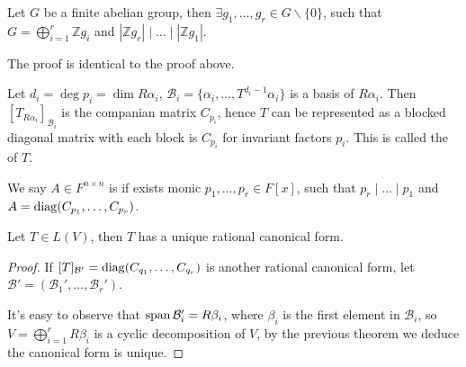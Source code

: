 \begin{theorem}
    Let $G$ be a finite abelian group, then $\exists g_1,\dots,g_r\in G\backslash\{0\}$,
	such that $G = \bigoplus_{i=1}^r \mathbb{Z}g_i$ and
	$|\mathbb{Z}g_r| \mid \dots \mid |\mathbb{Z}g_1|$.
\end{theorem}
\begin{remark}
    The proof is identical to the proof above.
\end{remark}

Let $d_i = \deg p_i = \dim R\alpha_i$,
$\mathcal{B}_i = \{\alpha_i,\dots,T^{d_i-1}\alpha_i\}$ is a basis of $R\alpha_i$.
Then $[T_{R\alpha_i}]_{\mathcal{B}_i}$ is the companian matrix $C_{p_i}$,
hence $T$ can be represented as a blocked diagonal matrix with
each block is $C_{p_i}$ for invariant factors $p_i$.
This is called the  of $T$.

\begin{definition}
	We say $A\in F^{n\times n}$ is  if exists monic $p_1,\dots,p_r\in F[x]$,
	such that $p_r\mid \dots \mid p_1$ and $A = \operatorname{diag}(C_{p_1},\dots,C_{p_r})$.
\end{definition}

\begin{theorem}
    Let $T\in L(V)$, then $T$ has a unique rational canonical form.
\end{theorem}
\begin{proof}[Proof]
	If $[T]_{\mathcal{B}'}=\operatorname{diag}(C_{q_1},\dots,C_{q_r})$ is another
	rational canonical form, let $\mathcal{B}' = (\mathcal{B}_1',\dots,\mathcal{B}_r')$.

	It's easy to observe that $\operatorname{span} \mathcal{B}_i' = R\beta_i$, where
	$\beta_i$ is the first element in $\mathcal{B}_i$,
	so $V = \bigoplus_{i=1}^r R\beta_i$ is a cyclic decomposition of $V$,
	by the previous theorem we deduce the canonical form is unique.
\end{proof}
